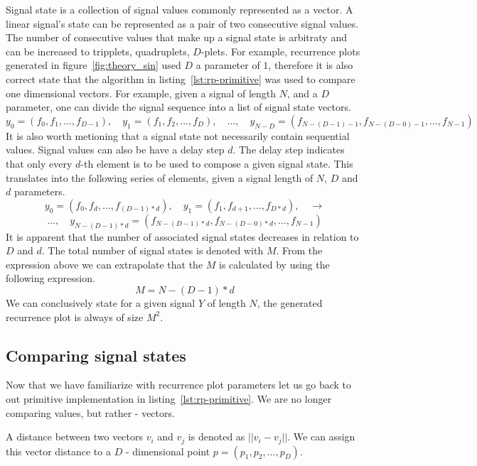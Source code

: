 \documentclass[a4paper,12pt,fleqn]{article}
\begin{document}
Signal state is a collection of signal values commonly represented as a vector.
A linear signal's state can be represented as a pair of two consecutive signal values.
The number of consecutive values that make up a signal state is arbitraty and can be increased to tripplets, quadruplets, $D$-plets.
For example, recurrence plots generated in figure~\ref{fig:theory_sin} used $D$ a parameter of $1$, therefore it is also correct state that the algorithm in listing~\ref{lst:rp-primitive} was used to compare one dimensional vectors.
For example, given a signal of length ${N}$, and a $D$ parameter, one can divide the signal sequence into a list of signal state vectors.
\[
  y_0=(f_0,f_1,...,f_{D-1}) ,\quad y_1=(f_1,f_2,...,f_{D}) ,\quad ...,\quad y_{N-D}=
  (f_{N-(D-1)-1},f_{N-(D-0)-1},...,f_{N-1})
\]
It is also worth metioning that a signal state not necessarily contain sequential values.
Signal values can also be have a delay step $d$.
The delay step indicates that only every $d$-th element is to be used to compose a given signal state.
This translates into the following series of elements, given a signal length of $N$, $D$ and $d$ parameters.
\[
  y_0=(f_0,f_{d},...,f_{(D-1)*d}) ,\quad y_1=(f_1,f_{d+1},...,f_{D*d}) , \quad \longrightarrow
\]
\[
  ...,\quad y_{N-(D-1)*d}=(f_{N-(D-1)*d},f_{N-(D-0)*d},...,f_{N-1})  
\]
It is apparent that the number of associated signal states decreases in relation to $D$ and $d$. 
The total number of signal states is denoted with $M$.
From the expression above we can extrapolate that the $M$ is calculated by using the following expression.
\[
  M = N-(D-1)*d
\]
We can conclusively state for a given signal $Y$ of length $N$, the generated recurrence plot is always of size $M^2$.

\subsection{Comparing signal states}
\label{sec:comparing-signal-states}
Now that we have familiarize with recurrence plot parameters let us go back to out primitive implementation in listing~\ref{lst:rp-primitive}.
We are no longer comparing values, but rather - vectors.

A distance between two vectors $v_i$ and $v_j$ is denoted as $||v_i - v_j||$.
We can assign this vector distance to a $D$ - dimensional point $p = (p_1, p_2, ..., p_D)$.
\end{document}
